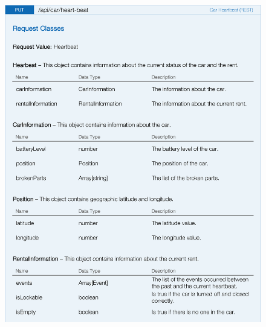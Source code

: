 \begin{figure}[H]
	\noindent
    	\centering
    	\includegraphics{apitables/APIHeartbeat1.png}
    	\label{fig:api-car-heartbeat1}
\end{figure}


